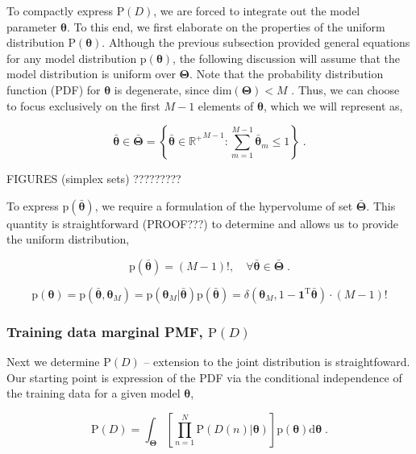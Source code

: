 \documentclass[12pt]{article}
\begin{document}
To compactly express $\text{P}(D)$, we are forced to integrate out the model parameter $\bm{\theta}$. To this end, we first elaborate on the properties of the uniform distribution $\text{P}(\bm{\theta})$. Although the previous subsection provided general equations for any model distribution $\text{p}(\bm{\theta})$, the following discussion will assume that the model distribution is uniform over $\bm{\Theta}$. Note that the probability distribution function (PDF) for $\bm{\theta}$ is degenerate, since $\text{dim}(\bm{\Theta}) < M$ . Thus, we can choose to focus exclusively on the first $M-1$ elements of $\bm{\theta}$, which we will represent as,

\begin{equation}
\bar{\bm{\theta}} \in \bar{\bm{\Theta}} = \left\{ \bar{\bm{\theta}} \in {\mathbb{R}^+}^{M-1}: \sum_{m=1}^{M-1} \bar{\bm{\theta}}_m \leq 1 \right\} \;.
\end{equation}

FIGURES (simplex sets) ?????????

To express $\text{p}\left(\bar{\bm{\theta}}\right)$, we require a formulation of the hypervolume of set $\bar{\bm{\Theta}}$. This quantity is straightforward (PROOF???) to determine and allows us to provide the uniform distribution,

\begin{equation}
\text{p}\left(\bar{\bm{\theta}}\right)= (M-1)!,  \quad \forall \bar{\bm{\theta}} \in \bar{\bm{\Theta}} \;.
\end{equation}

\begin{equation}
\text{p}(\bm{\theta}) = \text{p}(\bar{\bm{\theta}},\bm{\theta}_M) = \text{p}\left( \bm{\theta}_M | \bar{\bm{\theta}} \right) \text{p}\left(\bar{\bm{\theta}}\right)
= \delta\left( \bm{\theta}_M,1-\bm{1}^\text{T}\bar{\bm{\theta}} \right) \cdot  (M-1)!
\end{equation}



\subsubsection{Training data marginal PMF, $\text{P}(D)$}

Next we determine $\text{P}(D)$ -- extension to the joint distribution is straightfoward. Our starting point is expression of the PDF via the conditional independence of the training data for a given model $\bm{\theta}$,

\begin{equation}
\text{P}(D) = \int_{\bm{\Theta}} \left[ \prod_{n=1}^N \text{P}(D(n) | \bm{\theta}) \right] \text{p}(\bm{\theta}) \mathrm{d}\bm{\theta} \;.
\end{equation}
\end{document}
